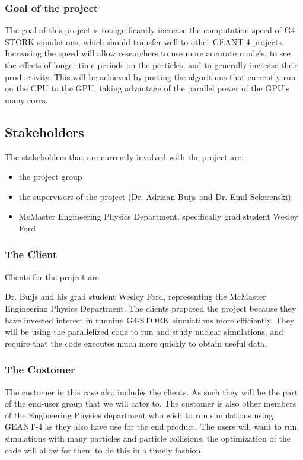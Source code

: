 \documentclass[12pt]{article}
\newcommand{\todo}[1]{\textcolor{red}{[TODO: #1]}} \else
\newcommand{\authornote}[3]{} \newcommand{\todo}[1]{} \fi
\newcommand{\ds}[1]{\authornote{blue}{DS}{#1}} %
\newcommand{\mmp}[1]{\authornote{green}{MP}{#1}}
\begin{document}
\subsubsection{Goal of the project}
The goal of this project is to significantly increase the computation speed of G4-STORK simulations, which should transfer well to other GEANT-4 projects. Increasing the speed will allow researchers to use more accurate models, to see the effects of longer time periods on the particles, and to generally increase their productivity. This will be achieved by porting the algorithms that currently run on the CPU to the GPU, taking advantage of the parallel power of the GPU's many cores.

\subsection{Stakeholders}\label{SubSec_Stakeholders} %
The stakeholders that are currently involved with the project are:
\begin{itemize}
\item the project group
\item the supervisors of the project (Dr. Adriaan Buijs and Dr. Emil Sekerenski)
\item McMaster Engineering Physics Department, specifically grad student Wesley Ford
\end{itemize}

\subsubsection{The Client}
Clients for the project are
\ds{Unnecessary ``the"}\mmp{Fixed}
Dr. Buijs and his grad student Wesley Ford, representing the McMaster Engineering Physics Department. The clients proposed the project because they have invested interest in running G4-STORK simulations more efficiently. They will be using the parallelized code to run and study nuclear simulations, and require that the code executes much more quickly to obtain useful data.
	
\subsubsection{The Customer}
The customer in this case also includes the clients. As such they will be the part of the end-user group that we will cater to.
The customer is also other members of the Engineering Physics department who wish to run simulations using GEANT-4 as they also have use for the end product. The users will want to run simulations with many particles and particle collisions, the optimization of the code will allow for them to do this in a timely fashion.
	
\end{document}
